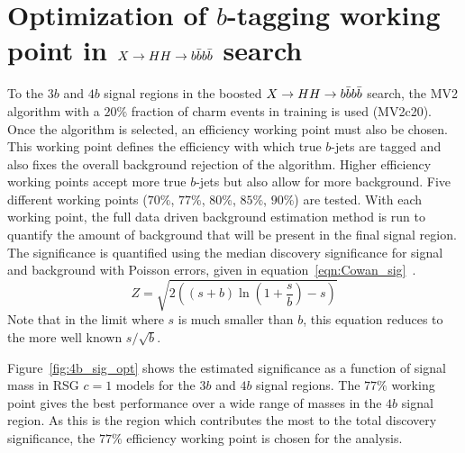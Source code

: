 \chapter{Optimization of $b$-tagging working point in $X\to HH \to b\bar{b}b\bar{b}$ search}
\label{AppendixA}

To the $3b$ and $4b$ signal regions in the boosted $X\to HH \to b\bar{b}b\bar{b}$ search, the MV2 algorithm with a $20\%$ fraction of charm events in training is used (MV2c20). Once the algorithm is selected, an efficiency working point must also be chosen. This working point defines the efficiency with which true $b$-jets are tagged and also fixes the overall background rejection of the algorithm. Higher efficiency working points accept more true $b$-jets but also allow for more background. Five different working points ($70\%$, $77\%$, $80\%$, $85\%$, $90\%$) are tested. With each working point, the full data driven background estimation method is run to quantify the amount of background that will be present in the final signal region. The significance is quantified using the median discovery significance for signal and background with Poisson errors, given in equation~\ref{eqn:Cowan_sig}~\cite{CowanSig}. 
%
\begin{equation}
\label{eqn:Cowan_sig}
Z = \sqrt{2\left((s+b)\ln\left(1+\frac{s}{b}\right) - s\right)}
\end{equation}
%
Note that in the limit where $s$ is much smaller than $b$, this equation reduces to the more well known $s/\sqrt{b}$. 

Figure~\ref{fig:4b_sig_opt} shows the estimated significance as a function of signal mass in RSG $c=1$ models for the $3b$ and $4b$ signal regions. The $77\%$ working point gives the best performance over a wide range of masses in the $4b$ signal region. As this is the region which contributes the most to the total discovery significance, the $77\%$ efficiency working point is chosen for the analysis. 


